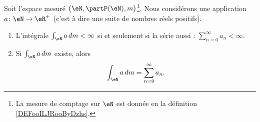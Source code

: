 \begin{proposition}     \label{PROPooPNQAooDRLcCm}
	Soit l'espace mesuré \( \big( \eN,\partP(\eN), m \big)\)\footnote{La mesure de comptage sur \( \eN\) est donnée en la définition \ref{DEFooILJRooByDzhs}.}. Nous considérons une application \( a\colon \eN\to \eR^+\) (c'est à dire une suite de nombres réels positifs).

	\begin{enumerate}
		\item
		      L'intégrale \( \int_{\eN}a\,dm<\infty\)  si et seulement si la série aussi : \( \sum_{n=0}^{\infty}a_n<\infty\).
		\item
		      Si \( \int_{\eN}a\,dm\) existe, alors
		      \begin{equation}      \label{EQooFIRMooKOEsAn}
			      \int_{\eN}a\,dm=\sum_{n=0}^{\infty}a_n.
		      \end{equation}
	\end{enumerate}
\end{proposition}

